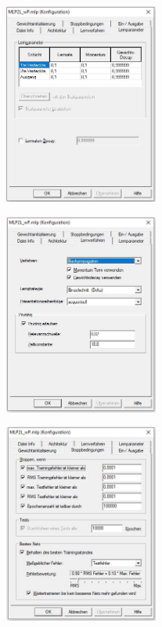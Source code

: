 \documentclass{article}
\begin{document}
\begin{doublespacing}
\begin{appendices}
\begin{figure}[H] 
    \centering
    \includegraphics[width=0.45\textwidth]{Images/Photos/LearnParametersWP.JPG} 
\end{figure}

\begin{figure}[H] 
    \centering
    \includegraphics[width=0.45\textwidth]{Images/Photos/LearnProcessWP.JPG} 
\end{figure}

\begin{figure}[H] 
    \centering
    \includegraphics[width=0.45\textwidth]{Images/Photos/StopConditionsWP.JPG} 
\end{figure}


\end{appendices}
\end{doublespacing}
\end{document}
